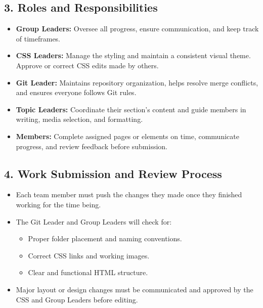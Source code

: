\documentclass[a4paper,12pt]{article}
\begin{document}
\begin{itemize}[leftmargin=1.2cm]
\vspace{0.3cm}
\subsection*{3. Roles and Responsibilities}
\begin{itemize}[leftmargin=1.2cm]
    \item \textbf{Group Leaders:} Oversee all progress, ensure communication, and keep track of timeframes.  
    \item \textbf{CSS Leaders:} Manage the styling and maintain a consistent visual theme. Approve or correct CSS edits made by others.  
    \item \textbf{Git Leader:} Maintains repository organization, helps resolve merge conflicts, and ensures everyone follows Git rules.  
    \item \textbf{Topic Leaders:} Coordinate their section’s content and guide members in writing, media selection, and formatting.  
    \item \textbf{Members:} Complete assigned pages or elements on time, communicate progress, and review feedback before submission.
\end{itemize}

\vspace{0.3cm}
\subsection*{4. Work Submission and Review Process}
\begin{itemize}[leftmargin=1.2cm]
    \item Each team member must push the changes they made once they finished working for the time being. 
    \item The Git Leader and Group Leaders will check for:
    \begin{itemize}[leftmargin=1.2cm]
        \item Proper folder placement and naming conventions.
        \item Correct CSS links and working images.
        \item Clear and functional HTML structure.
    \end{itemize}
    \item Major layout or design changes must be communicated and approved by the CSS and Group Leaders before editing.
\end{itemize}

\vspace{0.3cm}

\end{itemize}
\end{document}
